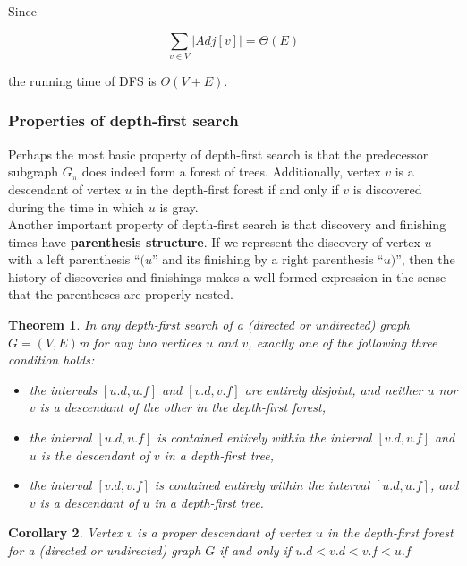 \documentclass[12pt]{article}
\newtheorem{theorem}{Theorem}
\newtheorem{corollary}[theorem]{Corollary}
\begin{document}
Since

\begin{equation*}
  \sum_{v \in V} |Adj[v]| = \Theta(E)
\end{equation*}

the running time of DFS is $\Theta(V+E)$. \\

\subsubsection*{Properties of depth-first search}

Perhaps the most basic property of depth-first search is that the predecessor subgraph $G_{\pi}$ does indeed form a forest of trees. Additionally, vertex $v$ is a descendant of vertex $u$ in the depth-first forest if and only if $v$ is discovered during the time in which $u$ is gray. \\

Another important property of depth-first search is that discovery and finishing times have \textbf{parenthesis structure}. If we represent the discovery of vertex $u$ with a left parenthesis ``$(u$'' and its finishing by a right parenthesis ``$u)$'', then the history of discoveries and finishings makes a well-formed expression in the sense that the parentheses are properly nested.

\begin{theorem}
  In any depth-first search of a (directed or undirected) graph $G=(V,E)$m for any two vertices $u$ and $v$, exactly one of the following three condition holds:
  \begin{itemize}
  \item the intervals $[u.d, u.f]$ and $[v.d, v.f]$ are entirely disjoint, and neither $u$ nor $v$ is a descendant of the other in the depth-first forest,
  \item the interval $[u.d, u.f]$ is contained entirely within the interval $[v.d, v.f]$ and $u$ is the descendant of $v$ in a depth-first tree,
  \item the interval $[v.d, v.f]$ is contained entirely within the interval $[u.d, u.f]$, and $v$ is a descendant of $u$ in a depth-first tree.
  \end{itemize}
\end{theorem}

\begin{corollary}
  Vertex $v$ is a proper descendant of vertex $u$ in the depth-first forest for a (directed or undirected) graph $G$ if and only if $u.d < v.d < v.f < u.f$
\end{corollary}
\end{document}
